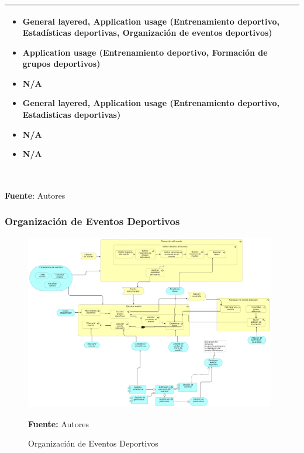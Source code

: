 \begin{table}[!htb]
\begin{center}
{\begin{tabular}{|p{7cm}|p{4cm}|}
\begin{itemize}
				\item General layered, Application usage (Entrenamiento deportivo, Estadísticas deportivas, Organización de eventos deportivos)
				\item Application usage (Entrenamiento deportivo, Formación de grupos deportivos)
				\item N/A
				\item General layered, Application usage (Entrenamiento deportivo, Estadisticas deportivas)
				\item N/A
				\item N/A
			\end{itemize} 
			\\
			\hline
		\end{tabular}
		} \\
		\textbf{Fuente}: Autores
	\end{center}
\end{table}

\subsubsection{Organización de Eventos Deportivos}

\begin{figure}[!htb]
  \begin{center}
    \includegraphics[width=11cm]{./imagenes/application_usage/organizacioneventosdeportivos.png}
    \caption{Organización de Eventos Deportivos}
    \label{fig:au_organizacion_eventos_deportivos}
    \textbf{Fuente:}  Autores
  \end{center}
\end{figure}

